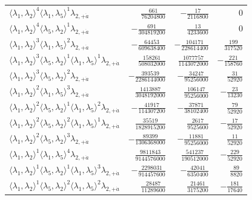 \begin{longtable}{@{}lrrr@{}}
$\langle\lambda_1,\lambda_2\rangle^{4}\langle\lambda_1,\lambda_5\rangle^{1}\lambda_{2,+\dot a}$ & $\frac{661}{76204800}$ & $-\frac{17}{2116800}$ & $0$ \\
$\langle\lambda_1,\lambda_2\rangle^{4}\langle\lambda_5,\lambda_2\rangle^{1}\lambda_{2,+\dot a}$ & $-\frac{691}{304819200}$ & $\frac{13}{4233600}$ & $0$ \\
$\langle\lambda_1,\lambda_2\rangle^{3}\langle\lambda_1,\lambda_5\rangle^{2}\lambda_{2,+\dot a}$ & $-\frac{64453}{609638400}$ & $-\frac{104171}{228614400}$ & $\frac{199}{317520}$ \\
$\langle\lambda_1,\lambda_2\rangle^{3}\langle\lambda_5,\lambda_2\rangle^{1}\langle\lambda_1,\lambda_5\rangle^{1}\lambda_{2,+\dot a}$ & $\frac{158261}{508032000}$ & $\frac{1077757}{1143072000}$ & $-\frac{221}{158760}$ \\
$\langle\lambda_1,\lambda_2\rangle^{3}\langle\lambda_5,\lambda_2\rangle^{2}\lambda_{2,+\dot a}$ & $-\frac{393539}{2286144000}$ & $-\frac{34247}{95256000}$ & $\frac{31}{52920}$ \\
$\langle\lambda_1,\lambda_2\rangle^{2}\langle\lambda_1,\lambda_5\rangle^{3}\lambda_{2,+\dot a}$ & $\frac{1413887}{3048192000}$ & $\frac{106147}{95256000}$ & $-\frac{23}{13230}$ \\
$\langle\lambda_1,\lambda_2\rangle^{2}\langle\lambda_5,\lambda_2\rangle^{1}\langle\lambda_1,\lambda_5\rangle^{2}\lambda_{2,+\dot a}$ & $-\frac{41917}{114307200}$ & $-\frac{37871}{38102400}$ & $\frac{79}{52920}$ \\
$\langle\lambda_1,\lambda_2\rangle^{2}\langle\lambda_5,\lambda_2\rangle^{2}\langle\lambda_1,\lambda_5\rangle^{1}\lambda_{2,+\dot a}$ & $\frac{35519}{1828915200}$ & $\frac{2617}{9525600}$ & $-\frac{17}{52920}$ \\
$\langle\lambda_1,\lambda_2\rangle^{2}\langle\lambda_5,\lambda_2\rangle^{3}\lambda_{2,+\dot a}$ & $-\frac{89399}{1306368000}$ & $-\frac{11881}{95256000}$ & $\frac{11}{52920}$ \\
$\langle\lambda_1,\lambda_2\rangle^{1}\langle\lambda_1,\lambda_5\rangle^{4}\lambda_{2,+\dot a}$ & $\frac{9811843}{9144576000}$ & $\frac{541237}{190512000}$ & $-\frac{229}{52920}$ \\
$\langle\lambda_1,\lambda_2\rangle^{1}\langle\lambda_5,\lambda_2\rangle^{1}\langle\lambda_1,\lambda_5\rangle^{3}\lambda_{2,+\dot a}$ & $-\frac{2298031}{914457600}$ & $-\frac{42041}{6350400}$ & $\frac{89}{8820}$ \\
$\langle\lambda_1,\lambda_2\rangle^{1}\langle\lambda_5,\lambda_2\rangle^{2}\langle\lambda_1,\lambda_5\rangle^{2}\lambda_{2,+\dot a}$ & $\frac{28487}{11289600}$ & $\frac{21461}{3175200}$ & $-\frac{181}{17640}$ \\

\end{longtable}
